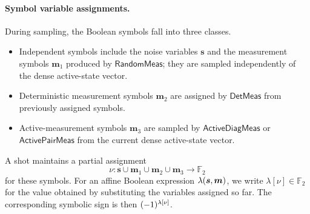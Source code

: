 \documentclass[a4paper,onecolumn,unpublished]{quantumarticle}
\DeclarePairedDelimiter\rbra{\lparen}{\rparen}
\newcommand{\iFont}[1]{\textsf{#1}}
\newcommand{\iRandomMeas}{\iFont{RandomMeas}}
\newcommand{\iDetMeas}{\iFont{DetMeas}}
\newcommand{\iActiveDiagMeas}{\iFont{ActiveDiagMeas}}
\newcommand{\iActivePairMeas}{\iFont{ActivePairMeas}}
\newcommand{\FF}{\mathbb{F}}
\begin{document}
\paragraph{Symbol variable assignments.}
During sampling, the Boolean symbols fall into three classes.
\begin{itemize}
    \item Independent symbols include the noise variables $\bm{s}$ and the measurement symbols $\bm{m}_1$ produced by $\iRandomMeas$; they are sampled independently of the dense active-state vector.
    \item Deterministic measurement symbols $\bm{m}_2$ are assigned by $\iDetMeas$ from previously assigned symbols.
    \item Active-measurement symbols $\bm{m}_3$ are sampled by $\iActiveDiagMeas$ or $\iActivePairMeas$ from the current dense active-state vector.
\end{itemize}

A shot maintains a partial assignment
\begin{equation*}
    \nu:
    \bm{s}\cup\bm{m}_1\cup\bm{m}_2\cup\bm{m}_3
    \longrightarrow
    \FF_2
\end{equation*}
for these symbols.
For an affine Boolean expression $\lambda\rbra{\bm{s},\bm{m}}$, we write $\lambda[\nu]\in\FF_2$ for the value obtained by substituting the variables assigned so far.
The corresponding symbolic sign is then $\rbra{-1}^{\lambda[\nu]}$.
\end{document}
